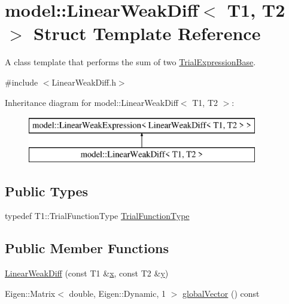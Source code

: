 \hypertarget{structmodel_1_1_linear_weak_diff}{}\section{model\+:\+:Linear\+Weak\+Diff$<$ T1, T2 $>$ Struct Template Reference}
\label{structmodel_1_1_linear_weak_diff}


A class template that performs the sum of two \hyperlink{structmodel_1_1_trial_expression_base}{Trial\+Expression\+Base}.  




{\ttfamily \#include $<$Linear\+Weak\+Diff.\+h$>$}

Inheritance diagram for model\+:\+:Linear\+Weak\+Diff$<$ T1, T2 $>$\+:\begin{figure}[H]
\begin{center}
\leavevmode
\includegraphics[height=2.000000cm]{structmodel_1_1_linear_weak_diff}
\end{center}
\end{figure}
\subsection*{Public Types}
\begin{DoxyCompactItemize}
\item 
typedef T1\+::\+Trial\+Function\+Type \hyperlink{structmodel_1_1_linear_weak_diff_aea0e41612eefdaad78e08842629e31a9}{Trial\+Function\+Type}
\end{DoxyCompactItemize}
\subsection*{Public Member Functions}
\begin{DoxyCompactItemize}
\item 
\hyperlink{structmodel_1_1_linear_weak_diff_ae3cc0288699c1df39f3adbe7c27b47d7}{Linear\+Weak\+Diff} (const T1 \&\hyperlink{generate_s_t_lcyl_8m_a9336ebf25087d91c818ee6e9ec29f8c1}{x}, const T2 \&\hyperlink{generate_s_t_lcyl_8m_a2fb1c5cf58867b5bbc9a1b145a86f3a0}{y})
\item 
Eigen\+::\+Matrix$<$ double, Eigen\+::\+Dynamic, 1 $>$ \hyperlink{structmodel_1_1_linear_weak_diff_a29337e4db8521e42fb8e71fe025c641b}{global\+Vector} () const 
\end{DoxyCompactItemize}

